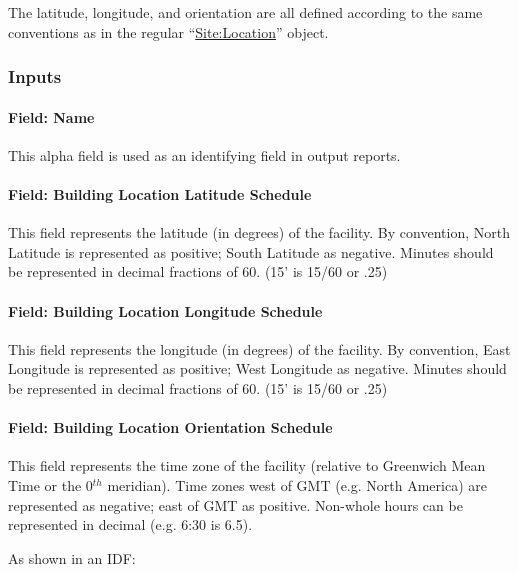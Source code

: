 The latitude, longitude, and orientation are all defined according to the same conventions as in the regular ``\hyperref[sitelocation]{Site:Location}'' object.

\subsubsection{Inputs}\label{inputs-026}

\paragraph{Field: Name}\label{field-name-025}

This alpha field is used as an identifying field in output reports.

\paragraph{Field: Building Location Latitude Schedule}\label{field-building-location-latitude-schedule}

This field represents the latitude (in degrees) of the facility. By convention, North Latitude is represented as positive; South Latitude as negative. Minutes should be represented in decimal fractions of 60. (15' is 15/60 or .25)

\paragraph{Field: Building Location Longitude Schedule}\label{field-building-location-longitude-schedule}

This field represents the longitude (in degrees) of the facility. By convention, East Longitude is represented as positive; West Longitude as negative. Minutes should be represented in decimal fractions of 60. (15' is 15/60 or .25)

\paragraph{Field: Building Location Orientation Schedule}\label{field-building-location-orientation-schedule}

This field represents the time zone of the facility (relative to Greenwich Mean Time or the 0\(^{th}\) meridian). Time zones west of GMT (e.g. North America) are represented as negative; east of GMT as positive. Non-whole hours can be represented in decimal (e.g. 6:30 is 6.5).

As shown in an IDF:

